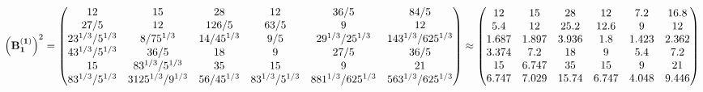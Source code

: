 \documentclass[10pt,a4paper]{article}
\begin{document}
	\[
		\left(\bold{B_1^{(1)}}\right)^{2} = 
		\begin{pmatrix}
			{{12}}{} & {{15}}{} & {{28}}{} & {{12}}{} & {{36}} / {{5}} & {{84}} / {{5}} \\
			{{27}} / {{5}} & {{12}}{} & {{126}} / {{5}} & {{63}} / {{5}} & {{9}}{} & {{12}}{} \\
			{{2}{3^ {1 / 3}}} / {{5^ {1 / 3}}} & {{8}} / {{75^ {1 / 3}}} & {{14}} / {{45^ {1 / 3}}} & {{9}} / {{5}} & {{2}{9^ {1 / 3}}} / {{25^ {1 / 3}}} & {{14}{3^ {1 / 3}}} / {{625^ {1 / 3}}} \\
			{{4}{3^ {1 / 3}}} / {{5^ {1 / 3}}} & {{36}} / {{5}} & {{18}}{} & {{9}}{} & {{27}} / {{5}} & {{36}} / {{5}} \\
			{{15}}{} & {{8}{3^ {1 / 3}}} / {{5^ {1 / 3}}} & {{35}}{} & {{15}}{} & {{9}}{} & {{21}}{} \\
			{{8}{3^ {1 / 3}}} / {{5^ {1 / 3}}} & {{3125^ {1 / 3}}} / {{9^ {1 / 3}}} & {{56}} / {{45^ {1 / 3}}} & {{8}{3^ {1 / 3}}} / {{5^ {1 / 3}}} & {{8}{81^ {1 / 3}}} / {{625^ {1 / 3}}} & {{56}{3^ {1 / 3}}} / {{625^ {1 / 3}}} \\
		\end{pmatrix}
		\approx
		\begin{pmatrix}
			12       & 15       & 28       & 12       & 7.2      & 16.8     \\
			5.4      & 12       & 25.2     & 12.6     & 9        & 12       \\
			1.687    & 1.897    & 3.936    & 1.8      & 1.423    & 2.362    \\
			3.374    & 7.2      & 18       & 9        & 5.4      & 7.2      \\
			15       & 6.747    & 35       & 15       & 9        & 21       \\
			6.747    & 7.029    & 15.74    & 6.747    & 4.048    & 9.446    \\
		\end{pmatrix}
	\]
\end{document}
